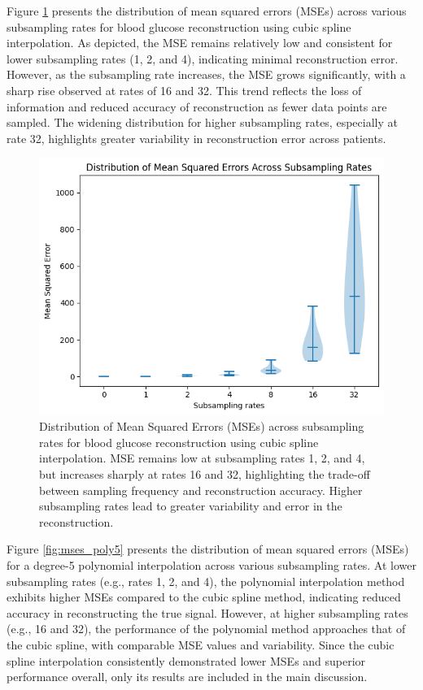 Figure \ref{fig:mses} presents the distribution of mean squared errors (MSEs) across various subsampling rates for blood glucose reconstruction using cubic spline interpolation. As depicted, the MSE remains relatively low and consistent for lower subsampling rates (1, 2, and 4), indicating minimal reconstruction error. However, as the subsampling rate increases, the MSE grows significantly, with a sharp rise observed at rates of 16 and 32. This trend reflects the loss of information and reduced accuracy of reconstruction as fewer data points are sampled. The widening distribution for higher subsampling rates, especially at rate 32, highlights greater variability in reconstruction error across patients.

\begin{figure}[h] %
	\centering
	\includegraphics[width=\linewidth]{Figures/distribution_mses.png} %
	\caption{Distribution of Mean Squared Errors (MSEs) across subsampling rates for blood glucose reconstruction using cubic spline interpolation. MSE remains low at subsampling rates 1, 2, and 4, but increases sharply at rates 16 and 32, highlighting the trade-off between sampling frequency and reconstruction accuracy. Higher subsampling rates lead to greater variability and error in the reconstruction.}
	\label{fig:mses}  %
\end{figure}
Figure \ref{fig:mses_poly5} presents the distribution of mean squared errors (MSEs) for a degree-5 polynomial interpolation across various subsampling rates. At lower subsampling rates (e.g., rates 1, 2, and 4), the polynomial interpolation method exhibits higher MSEs compared to the cubic spline method, indicating reduced accuracy in reconstructing the true signal. However, at higher subsampling rates (e.g., 16 and 32), the performance of the polynomial method approaches that of the cubic spline, with comparable MSE values and variability. Since the cubic spline interpolation consistently demonstrated lower MSEs and superior performance overall, only its results are included in the main discussion.
